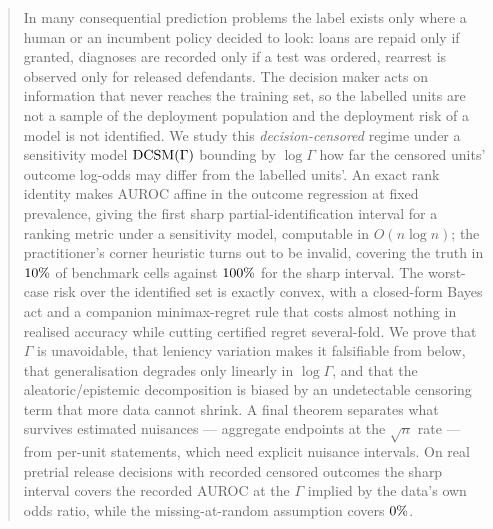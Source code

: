 \documentclass{article}
\theoremstyle{plain}
\theoremstyle{definition}
\newcommand{\dcsm}{\textup{DCSM}}
\begin{document}
\printAffiliationsAndNotice{}

\begin{abstract}
In many consequential prediction problems the label exists only where a human
or an incumbent policy decided to look: loans are repaid only if granted,
diagnoses are recorded only if a test was ordered, rearrest is observed only
for released defendants. The decision maker acts on information that never
reaches the training set, so the labelled units are not a sample of the
deployment population and the deployment risk of a model is not identified.
We study this \emph{decision-censored} regime under a sensitivity model
$\dcsm(\Gamma)$ bounding by $\log\Gamma$ how far the censored units' outcome
log-odds may differ from the labelled units'. An exact rank identity makes
AUROC affine in the outcome regression at fixed prevalence, giving the first
sharp partial-identification interval for a ranking metric under a sensitivity
model, computable in $O(n\log n)$; the practitioner's corner heuristic turns
out to be invalid, covering the truth in $\nExpOneCovCorner$ of benchmark
cells against $\nExpOneCovSharp$ for the sharp interval. The worst-case risk
over the identified set is exactly convex, with a closed-form Bayes act and a
companion minimax-regret rule that costs almost nothing in realised accuracy
while cutting certified regret several-fold. We prove that $\Gamma$ is
unavoidable, that leniency variation makes it falsifiable from below, that
generalisation degrades only linearly in $\log\Gamma$, and that the
aleatoric/epistemic decomposition is biased by an undetectable censoring term
that more data cannot shrink. A final theorem separates what survives
estimated nuisances --- aggregate endpoints at the $\sqrt n$ rate --- from
per-unit statements, which need explicit nuisance intervals. On real pretrial
release decisions with recorded censored outcomes the sharp interval covers
the recorded AUROC at the $\Gamma$ implied by the data's own odds ratio, while
the missing-at-random assumption covers $\nCompasCovAtOne$.
\end{abstract}
















\onecolumn
\appendix





\end{document}
